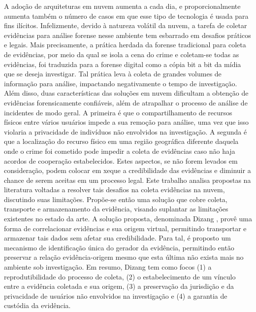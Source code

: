\documentclass[a4paper,capchap,espacoduplo,normaltoc]{abntepusp}
\newcommand{\fancyname}{Dizang }
\begin{document}
\begin{resumo}
A adoção de arquiteturas em nuvem aumenta a cada dia, e proporcionalmente aumenta também o número de casos em que esse tipo de tecnologia é usada para fins ilícitos.
%
%
Infelizmente, devido à natureza volátil da nuvem, a tarefa de coletar evidências para análise forense nesse ambiente tem esbarrado em desafios práticos e legais.
%
Mais precisamente, a prática herdada da forense tradicional para coleta de evidências, por meio da qual se isola a cena do crime e coletam-se todas as evidências, foi traduzida para a forense digital como a cópia bit a bit da mídia que se deseja investigar.
%
Tal prática leva à coleta de grandes volumes de informação para análise, impactando negativamente o tempo de investigação.
%
Além disso, duas características das soluções em nuvem dificultam a obtenção de evidências forensicamente confiáveis, além de atrapalhar o processo de análise de incidentes de modo geral. 
%
A primeira é que o compartilhamento de recursos físicos entre vários usuários impede a sua remoção para análise, uma vez que isso violaria a privacidade de indivíduos não envolvidos na investigação.
%
A segunda é que a localização do recurso físico em uma região geográfica diferente daquela onde o crime foi cometido pode impedir a coleta de evidências caso não haja acordos de cooperação estabelecidos.
%
Estes aspectos, se não forem levados em consideração, podem colocar em xeque a credibilidade das evidências e diminuir a chance de serem aceitas em um processo legal. %
%
Este trabalho analisa propostas na literatura voltadas a resolver tais desafios na coleta evidências na nuvem, discutindo suas limitações.
%
Propõe-se então uma solução que cobre coleta, transporte e armazenamento da evidência, visando suplantar as limitações existentes no estado da arte. 
%
A solução proposta, denominada \fancyname, provê uma forma de correlacionar evidências e sua origem virtual, permitindo transportar e armazenar tais dados sem afetar sua credibilidade.
%
Para tal, é proposto um mecanismo de identificação única do gerador da evidência, permitindo então preservar a relação evidência-origem mesmo que esta última não exista mais no ambiente sob investigação. %
%
Em resumo, \fancyname tem como focos (1) a reprodutibilidade do processo de coleta, (2) o estabelecimento de um vínculo entre a evidência coletada e sua origem, (3) a preservação da jurisdição e da privacidade de usuários não envolvidos na investigação e (4) a garantia de custódia da evidência.
%
\end{resumo}
\end{document}
